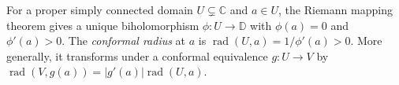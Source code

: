 
For a proper simply connected domain $U\subsetneq\mathbb C$ and $a\in U$, the Riemann mapping theorem gives a unique biholomorphism $\phi:U\to\mathbb D$ with $\phi(a)=0$ and $\phi'(a)>0$. The \emph{conformal radius} at $a$ is $\operatorname{rad}(U,a)=1/\phi'(a)>0$. More generally, it transforms under a conformal equivalence $g:U\to V$ by $\operatorname{rad}(V,g(a))=|g'(a)|\operatorname{rad}(U,a)$.
